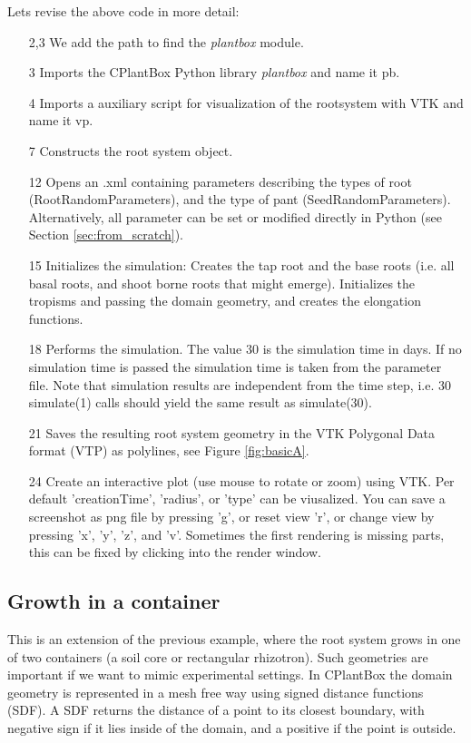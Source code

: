 \noindent 
Lets revise the above code in more detail: 
\begin{itemize}
 \item[2,3] We add the path to find the \emph{plantbox} module.
 \item[3] Imports the CPlantBox Python library \emph{plantbox} and name it pb.
 \item[4] Imports a auxiliary script for visualization of the rootsystem with VTK and name it vp.
 \item[7] Constructs the root system object.
 \item[12] Opens an .xml containing parameters describing the types of root (RootRandomParameters), 
 and the type of pant (SeedRandomParameters). Alternatively, all parameter can be set or modified directly in Python 
 (see Section \ref{sec:from_scratch}).
 \item[15] Initializes the simulation: Creates the tap root and the base roots
 (i.e. all basal roots, and shoot borne roots that might emerge). Initializes the tropisms and passing the domain geometry, 
 and creates the elongation functions. 
 \item[18] Performs the simulation. The value 30 is the simulation time in days. 
 If no simulation time is passed the simulation time is taken from the parameter file. 
 Note that simulation results are independent from the time step, i.e. 30 simulate(1) calls should yield the same result 
 as simulate(30). 
 \item[21] Saves the resulting root system geometry in the VTK Polygonal Data format (VTP) as polylines, 
 see Figure \ref{fig:basicA}. 
 \item[24] Create an interactive plot (use mouse to rotate or zoom) using VTK. 
 Per default 'creationTime', 'radius', or 'type' can be viusalized.
 You can save a screenshot as png file by pressing 'g', or reset view 'r', or change view by pressing 'x', 'y', 'z', and 'v'.
 Sometimes the first rendering is missing parts, this can be fixed by clicking into the render window. 
 \end{itemize}
  
\subsection{Growth in a container}

This is an extension of the previous example, where the root system grows in one of two containers 
(a soil core or rectangular rhizotron). Such geometries are important if we want to mimic experimental settings. 
In CPlantBox the domain geometry is represented in a mesh free way using signed distance functions (SDF). 
A SDF returns the distance of a point to its closest boundary, with negative sign if it lies inside of the domain, 
and a positive if the point is outside.

